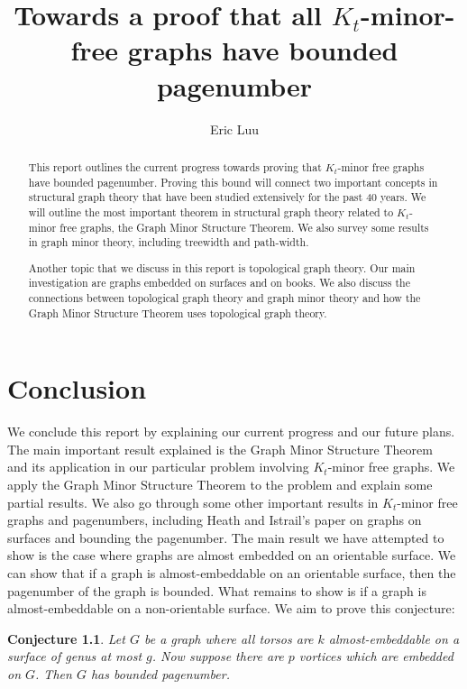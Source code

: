 \documentclass[notitlepage]{report}
\title{Towards a proof that all \(K_t\)-minor-free graphs have bounded pagenumber}
\author{Eric Luu}
\newtheorem{conjecture}[theorem]{Conjecture}
\theoremstyle{definition}
\numberwithin{theorem}{section}
\numberwithin{equation}{section}
\begin{document}
\maketitle
\begin{abstract}
	This report outlines the current progress towards proving that \(K_t\)-minor free graphs have bounded pagenumber. Proving this bound will connect two important concepts in structural graph theory that have been studied extensively for the past 40 years. We will outline the most important theorem in structural graph theory related to \(K_t\)-minor free graphs, the Graph Minor Structure Theorem. We also survey some results in graph minor theory, including treewidth and path-width. 

	Another topic that we discuss in this report is topological graph theory. Our main investigation are graphs embedded on surfaces and on books. We also discuss the connections between topological graph theory and graph minor theory and how the Graph Minor Structure Theorem uses topological graph theory. 
\end{abstract}
\listoftodos

\setcounter{tocdepth}{1}
\tableofcontents














\chapter{Conclusion}\label{chap:conclusion}
We conclude this report by explaining our current progress and our future plans.
The main important result explained is the Graph Minor Structure Theorem~\cite{robertsonGraphMinorsXVI2003} and its application in our particular problem involving \(K_t\)-minor free graphs. We apply the Graph Minor Structure Theorem to the problem and explain some partial results.
We also go through some other important results in \(K_t\)-minor free graphs and pagenumbers, including Heath and Istrail's \cite{heathPagenumberGenusGraphs1992} paper on graphs on surfaces and bounding the pagenumber.
The main result we have attempted to show is the case where graphs are almost embedded on an orientable surface. We can show that if a graph is almost-embeddable on an orientable surface, then the pagenumber of the graph is bounded.
What remains to show is if a graph is almost-embeddable on a non-orientable surface.
We aim to prove this conjecture:
\begin{conjecture}
	Let $G$ be a graph where all torsos are $k$ almost-embeddable on a surface of genus at most $g$. Now suppose there are $p$ vortices which are embedded on $G$. Then $G$ has bounded pagenumber.
\end{conjecture}
\end{document}
